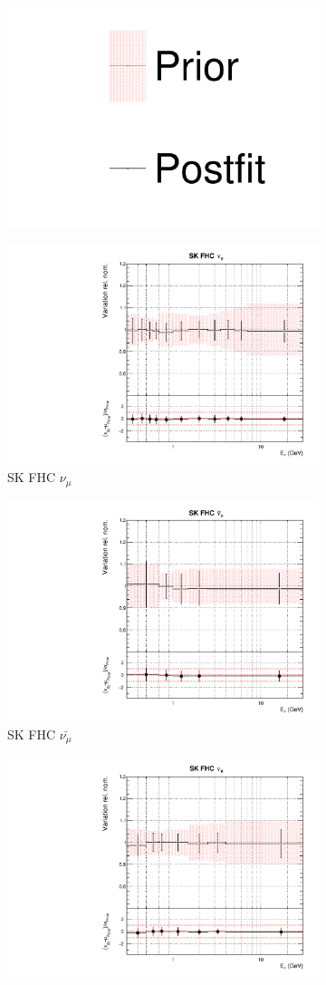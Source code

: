 \begin{figure}[!htbp]
\centering
\begin{subfigure}{0.8\textwidth}
  \centering
  \includegraphics[width=0.24\linewidth]{figs/asmv_leg}
\end{subfigure}
\begin{subfigure}{0.45\textwidth}
  \centering
  \includegraphics[width=0.75\linewidth]{figs/asmvfluxpoly8}
  \caption{SK FHC $\nu_{\mu}$}
\end{subfigure}
\begin{subfigure}{0.45\textwidth}
  \centering
  \includegraphics[width=0.75\linewidth]{figs/asmvfluxpoly9}
  \caption{SK FHC $\bar{\nu_{\mu}}$}
\end{subfigure}
\begin{subfigure}{0.45\textwidth}
  \centering
  \includegraphics[width=0.75\linewidth]{figs/asmvfluxpoly10}

\end{subfigure}
\end{figure}

